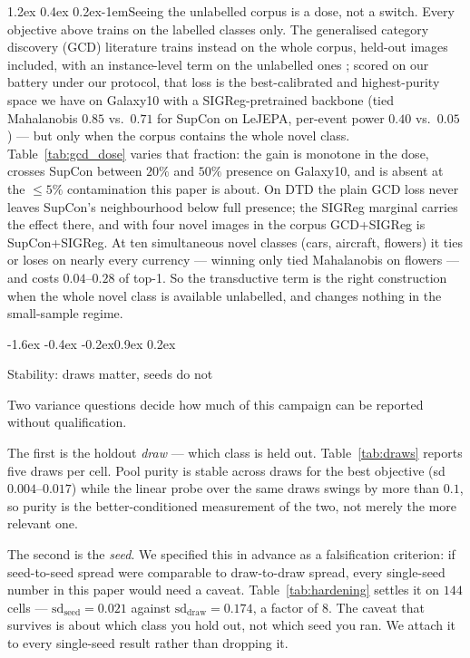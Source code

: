 \documentclass{article}
\makeatletter
\renewcommand\subsection{\@startsection{subsection}{2}{\z@}%
  {-1.6ex \@plus -0.4ex \@minus -0.2ex}{0.9ex \@plus 0.2ex}%
  {\normalsize\bf\raggedright}}
\renewcommand\paragraph{\@startsection{paragraph}{4}{\z@}%
  {1.2ex \@plus 0.4ex \@minus 0.2ex}{-1em}{\normalsize\bf}}
\makeatother
\begin{document}
\paragraph{Seeing the unlabelled corpus is a dose, not a switch.} Every
objective above trains on the labelled classes only. The generalised
category discovery (GCD) literature trains instead on the whole corpus, held-out
images included, with an instance-level term on the unlabelled ones
\citep{vaze2022gcd,wen2023simgcd}; scored on our battery under our protocol, that loss is
the best-calibrated and highest-purity space we have on Galaxy10 with a
SIGReg-pretrained backbone (tied Mahalanobis $0.85$ vs.\ $0.71$ for SupCon on
LeJEPA, per-event power $0.40$ vs.\ $0.05$) --- but only when the corpus
contains the whole novel class. Table~\ref{tab:gcd_dose} varies that
fraction: the gain is monotone in the dose, crosses SupCon between $20\%$
and $50\%$ presence on Galaxy10, and is absent at the $\le 5\%$
contamination this paper is about. On DTD the plain GCD loss never leaves
SupCon's neighbourhood below full presence; the SIGReg marginal carries the
effect there, and with four novel images in the corpus GCD+SIGReg is
SupCon+SIGReg. At ten simultaneous novel classes (cars, aircraft, flowers)
it ties or loses on nearly every currency --- winning only tied Mahalanobis
on flowers --- and costs $0.04$--$0.28$ of top-1. So the
transductive term is the right construction when the whole novel class is
available unlabelled, and changes nothing in the small-sample regime.


\subsection{Stability: draws matter, seeds do not}



Two variance questions decide how much of this campaign can be reported without qualification.

The first is the holdout \emph{draw} --- which class is held out.
Table~\ref{tab:draws} reports five draws per cell. Pool purity is stable
across draws for the best objective (sd $0.004$--$0.017$) while the linear
probe over the same draws swings by more than $0.1$, so purity is the
better-conditioned measurement of the two, not merely the more relevant one.

The second is the \emph{seed}. We specified this in advance as a falsification criterion: if
seed-to-seed spread were comparable to draw-to-draw spread, every single-seed
number in this paper would need a caveat. Table~\ref{tab:hardening} settles
it on $144$ cells --- $\text{sd}_{\text{seed}} = 0.021$ against
$\text{sd}_{\text{draw}} = 0.174$, a factor of $8$. The caveat that survives
is about which class you hold out, not which seed you ran. We attach it to
every single-seed result rather than dropping it.
\end{document}
